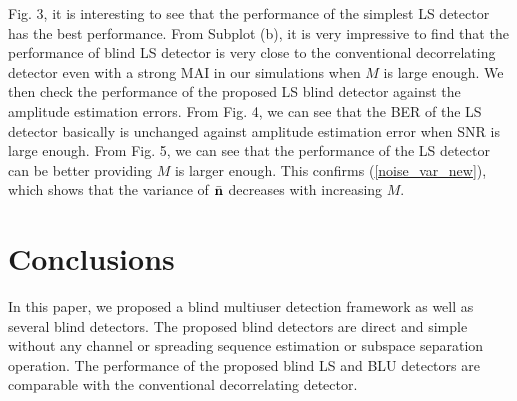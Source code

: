 \documentclass[a4paper,10pt,fleqn, twocolumn]{IEEETran}
\newcommand{\bn}{{\bf n}}
\begin{document}
Fig. 3, it is interesting to see that the performance of the
simplest LS detector has the best performance. From Subplot (b),
it is very impressive to find that the performance of blind LS
detector is very close to the conventional decorrelating detector
even with a strong MAI in our simulations when $M$ is large
enough. We then check the performance of the proposed LS blind
detector against the amplitude estimation errors. From Fig. 4, we
can see that the BER of the LS detector basically is unchanged
against amplitude estimation error when SNR is large enough. From
Fig. 5, we can see that the performance of the LS detector can be
better providing $M$ is larger enough. This confirms
(\ref{noise_var_new}), which shows that the variance of
$\bar{\bn}$ decreases with increasing $M$.
\section{Conclusions}
In this paper, we proposed a blind multiuser detection framework
as well as several blind detectors. The proposed blind detectors
are direct and simple without any channel or spreading sequence
estimation or subspace separation operation. The performance of
the proposed blind LS and BLU detectors are comparable with the
conventional decorrelating detector.

\small


\end{document}
